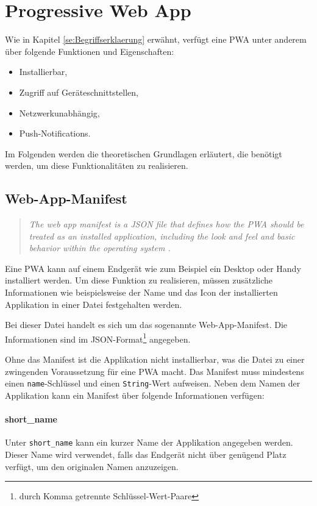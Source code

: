 
\chapter{Progressive Web App}

Wie in Kapitel \ref{se:Begriffserklaerung} erwähnt, verfügt eine PWA unter anderem über folgende Funktionen und Eigenschaften: 
\begin{itemize}
    \item Installierbar,
    \item Zugriff auf Geräteschnittstellen, 
    \item Netzwerkunabhängig,
    \item Push-Notifications.
\end{itemize} 

Im Folgenden werden die theoretischen Grundlagen erläutert, die benötigt werden, um diese Funktionalitäten zu realisieren. 


\section{Web-App-Manifest}\label{sec:webappmanifest}

\begin{quote}
   \textit{The web app manifest is a JSON file that defines how the PWA should be treated as an installed application, including the look and feel and basic behavior within the operating system \cite{Developers2022}. }
\end{quote}

Eine PWA kann auf einem Endgerät wie zum Beispiel ein Desktop oder Handy installiert werden. Um diese Funktion zu realisieren, müssen zusätzliche Informationen wie beispielsweise der Name und das Icon der installierten Applikation in einer Datei festgehalten werden. 

Bei dieser Datei handelt es sich um das sogenannte Web-App-Manifest. Die Informationen sind im \ac{JSON}-Format\footnote{durch Komma getrennte Schlüssel-Wert-Paare} angegeben. 

Ohne das Manifest ist die Applikation nicht installierbar, was die Datei zu einer zwingenden Voraussetzung für eine PWA macht. 
Das Manifest muss mindestens einen \texttt{name}-Schlüssel und einen \texttt{String}-Wert aufweisen. 
Neben dem Namen der Applikation kann ein Manifest über folgende Informationen verfügen: 

\subsubsection{short\_name}
Unter \texttt{short\_name} kann ein kurzer Name der Applikation angegeben werden. Dieser Name wird verwendet, falls das Endgerät nicht über genügend Platz verfügt, um den originalen Namen anzuzeigen. 


